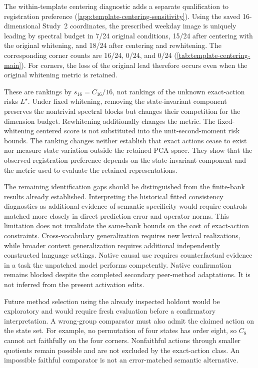 The within-template centering diagnostic adds a
separate qualification to registration preference
(\cref{app:template-centering-sensitivity}).
Using the saved 16-dimensional Study~2 coordinates,
the prescribed weekday image is uniquely leading
by spectral budget in 7/24 original conditions,
15/24 after centering with the original whitening,
and 18/24 after centering and rewhitening.
The corresponding corner counts are 16/24,
0/24, and 0/24
(\cref{tab:template-centering-main}).
For corners, the loss of the original lead
therefore occurs even when the original
whitening metric is retained.

These are rankings by $s_{16}=C_{16}/16$,
not rankings of the unknown exact-action risks
$L^\star$.
Under fixed whitening, removing the state-invariant
component preserves the nontrivial spectral blocks
but changes their competition for the dimension
budget.
Rewhitening additionally changes the metric.
The fixed-whitening centered score is not
substituted into the unit-second-moment risk
bounds.
The ranking changes neither establish that
exact actions cease to exist nor measure
state variation outside the retained PCA space.
They show that the observed registration
preference depends on the state-invariant
component and the metric used to evaluate
the retained representations.

The remaining identification gaps should be
distinguished from the finite-bank results
already established.
Interpreting the historical fitted consistency
diagnostics as additional evidence of semantic
specificity would require controls matched
more closely in direct prediction error and
operator norms.
This limitation does not invalidate the
same-bank bounds on the cost of exact-action
constraints.
Cross-vocabulary generalization requires new
lexical realizations, while broader context
generalization requires additional independently
constructed language settings.
Native causal use requires counterfactual
evidence in a task the unpatched model performs
competently.
Native confirmation remains blocked despite
the completed secondary peer-method adaptations.
It is not inferred from the present activation
edits.

Future method selection using the already
inspected holdout would be exploratory and
would require fresh evaluation before a
confirmatory interpretation.
A wrong-group comparator must also admit the
claimed action on the state set.
For example, no permutation of four states
has order eight, so $C_8$ cannot act faithfully
on the four corners.
Nonfaithful actions through smaller quotients
remain possible and are not excluded by the
exact-action class.
An impossible faithful comparator is not an
error-matched semantic alternative.
